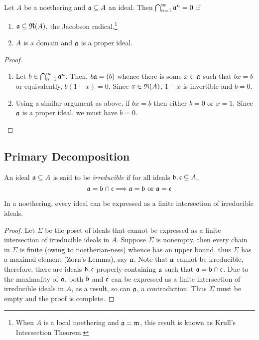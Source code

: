 \begin{corollary}
    Let $A$ be a noethering and $\mathfrak a\subseteq A$ an ideal. Then $\bigcap_{n = 1}^\infty\mathfrak a^n = 0$ if 
    \begin{enumerate}[label=(\alph*)]
        \item $\mathfrak a\subseteq\mathfrak R(A)$, the Jacobson radical.\footnote{When $A$ is a local noethering and $\mathfrak a = \mathfrak m$, this result is known as Krull's Intersection Theorem.}
        \item $A$ is a domain and $\mathfrak a$ is a proper ideal.
    \end{enumerate}
\end{corollary}
\begin{proof}
\begin{enumerate}[label=(\alph*)]
    \item Let $b\in\bigcap_{n = 1}^\infty\mathfrak a^n$. Then, $b\mathfrak a = (b)$ whence there is some $x\in\mathfrak a$ such that $bx = b$ or equivalently, $b(1 - x) = 0$. Since $x\in\mathfrak R(A)$, $1 - x$ is invertible and $b = 0$.
    \item Using a similar argument as above, if $bx = b$ then either $b = 0$ or $x = 1$. Since $\mathfrak a$ is a proper ideal, we must have $b = 0$.
\end{enumerate}
\end{proof}

\subsection{Primary Decomposition}

\begin{definition}[Irreducible]
    An ideal $\mathfrak a\subseteq A$ is said to be \textit{irreducible} if for all ideals $\mathfrak b,\mathfrak c\subseteq A$,
    \begin{equation*}
        \mathfrak a = \mathfrak b\cap\mathfrak c\Longrightarrow \mathfrak a = \mathfrak b\text{ or }\mathfrak a = \mathfrak c
    \end{equation*}
\end{definition}

\begin{lemma}
    In a noethering, every ideal can be expressed as a finite intersection of irreducible ideals.
\end{lemma}
\begin{proof}
    Let $\Sigma$ be the poset of ideals that cannot be expressed as a finite intersection of irreducible ideals in $A$. Suppose $\Sigma$ is nonempty, then every chain in $\Sigma$ is finite (owing to noetherian-ness) whence has an upper bound, thus $\Sigma$ has a maximal element (Zorn's Lemma), say $\mathfrak a$. Note that $\mathfrak a$ cannot be irreducible, therefore, there are ideals $\mathfrak b,\mathfrak c$ properly containing $\mathfrak a$ such that $\mathfrak a = \mathfrak b\cap\mathfrak c$. Due to the maximality of $\mathfrak a$, both $\mathfrak b$ and $\mathfrak c$ can be expressed as a finite intersection of irreducible ideals in $A$, as a result, so can $\mathfrak a$, a contradiction. Thus $\Sigma$ must be empty and the proof is complete.
\end{proof}

